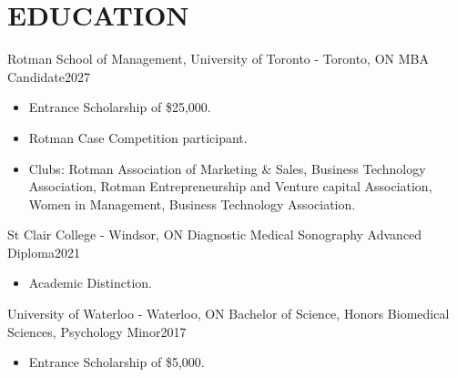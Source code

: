 
\section{\textcolor{airforceblue}{EDUCATION}}
  \employmentSubheadingListStart
    \employmentSubheading
      {Rotman School of Management, University of Toronto - Toronto, ON}{}
      {MBA Candidate}{2027}
      \begin{itemize}[leftmargin=1.5em]
        \item Entrance Scholarship of \$25,000.
        \item Rotman Case Competition participant.
        \item Clubs: Rotman Association of Marketing \& Sales, Business Technology Association, Rotman Entrepreneurship and Venture capital Association, Women in Management, Business Technology Association.
      \end{itemize}
    \employmentSubheading
      {St Clair College - Windsor, ON}{}
      {Diagnostic Medical Sonography Advanced Diploma}{2021}
      \begin{itemize}[leftmargin=1.5em]
        \item Academic Distinction.
      \end{itemize}
    \employmentSubheading
      {University of Waterloo - Waterloo, ON}{}
      {Bachelor of Science, Honors Biomedical Sciences, Psychology Minor}{2017}
      \begin{itemize}[leftmargin=1.5em]
        \item Entrance Scholarship of \$5,000.
      \end{itemize}
  \employmentSubheadingListEnd
  \vspace{-16pt}
